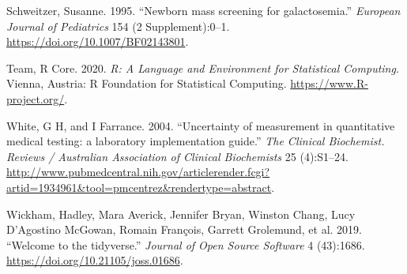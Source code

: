 \documentclass[review]{elsarticle}
\begin{document}
\begin{hangparas}{1.5em}{1}
\hypertarget{citeproc_bib_item_9}{Schweitzer, Susanne. 1995. “Newborn mass screening for galactosemia.” \textit{European Journal of Pediatrics} 154 (2 Supplement):0–1. \href{https://doi.org/10.1007/BF02143801}{https://doi.org/10.1007/BF02143801}.}

\hypertarget{citeproc_bib_item_10}{Team, R Core. 2020. \textit{R: A Language and Environment for Statistical Computing}. Vienna, Austria: R Foundation for Statistical Computing. \href{https://www.R-project.org/}{https://www.R-project.org/}.}

\hypertarget{citeproc_bib_item_11}{White, G H, and I Farrance. 2004. “Uncertainty of measurement in quantitative medical testing: a laboratory implementation guide.” \textit{The Clinical Biochemist. Reviews / Australian Association of Clinical Biochemists} 25 (4):S1–24. \href{http://www.pubmedcentral.nih.gov/articlerender.fcgi?artid=1934961&tool=pmcentrez&rendertype=abstract}{http://www.pubmedcentral.nih.gov/articlerender.fcgi?artid=1934961\&tool=pmcentrez\&rendertype=abstract}.}

\hypertarget{citeproc_bib_item_12}{Wickham, Hadley, Mara Averick, Jennifer Bryan, Winston Chang, Lucy D’Agostino McGowan, Romain François, Garrett Grolemund, et al. 2019. “Welcome to the tidyverse.” \textit{Journal of Open Source Software} 4 (43):1686. \href{https://doi.org/10.21105/joss.01686}{https://doi.org/10.21105/joss.01686}.}
\end{hangparas}
\end{document}
